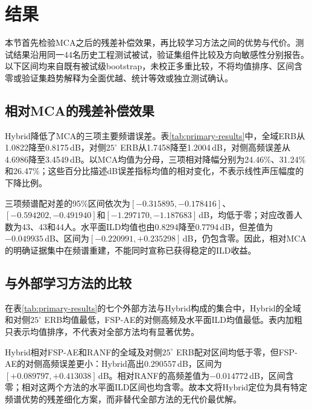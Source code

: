 \section{结果}
\label{sec:results}

本节首先检验MCA之后的残差补偿效果，再比较学习方法之间的优势与代价。测试结果沿用同一44名历史工程测试被试，验证集组件比较及方向敏感性分别报告。以下区间均来自既有被试级bootstrap，未校正多重比较，不将均值排序、区间含零或验证集趋势解释为全面优越、统计等效或独立测试确认。

\subsection{相对MCA的残差补偿效果}
Hybrid降低了MCA的三项主要频谱误差。表\ref{tab:primary-results}中，全域ERB从1.0822降至0.8175\,dB，对侧$25^\circ$ ERB从1.7458降至1.2004\,dB，对侧高频误差从4.6986降至3.4549\,dB。以MCA均值为分母，三项相对降幅分别为24.46\%、31.24\%和26.47\%；这些百分比描述dB误差指标均值的相对变化，不表示线性声压幅度的下降比例。



三项频谱配对差的95\%区间依次为$[-0.315895,-0.178416]$、$[-0.594202,-0.491940]$和$[-1.297170,-1.187683]$\,dB，均低于零；对应改善人数为43、43和44人。水平面ILD均值也由0.8294降至0.7794\,dB，但差值为$-0.049935$\,dB、区间为$[-0.220991,+0.235298]$\,dB，仍包含零。因此，相对MCA的明确证据集中在频谱重建，不能同时宣称已获得稳定的ILD收益。

\subsection{与外部学习方法的比较}
在表\ref{tab:primary-results}的七个外部方法与Hybrid构成的集合中，Hybrid的全域和对侧$25^\circ$ ERB均值最低，FSP-AE的对侧高频及水平面ILD均值最低。表内加粗只表示均值排序，不代表对全部方法均有显著优势。

Hybrid相对FSP-AE和RANF的全域及对侧$25^\circ$ ERB配对区间均低于零，但FSP-AE的对侧高频误差更小：Hybrid高出$0.290557$\,dB，区间为$[+0.089797,+0.413038]$\,dB。相对RANF的高频差值为$-0.014772$\,dB，区间含零；相对这两个方法的水平面ILD区间也均含零。故本文将Hybrid定位为具有特定频谱优势的残差细化方案，而非替代全部方法的无代价最优解。

